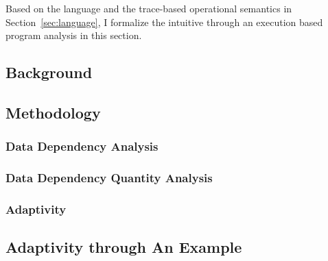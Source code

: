 
Based on the language and the trace-based operational semantics in Section~\ref{sec:language},
I formalize the intuitive through an execution based program analysis in this section.

\subsection{Background}
\label{subsec:dynamic-intro}


\subsection{Methodology}
\label{subsec:dynamic-methodology}

\subsubsection{Data Dependency Analysis}
\label{subsubsec:dynamic-datadep}

\subsubsection{Data Dependency Quantity Analysis}
\label{subsubsec:dynamic-reachability}
%
\subsubsection{Adaptivity}
\label{subsubsec:dynamic-adapt}
%
%
\subsection{Adaptivity through An Example}
\label{subsec:dynamic-examples}

%

% 
%
%
